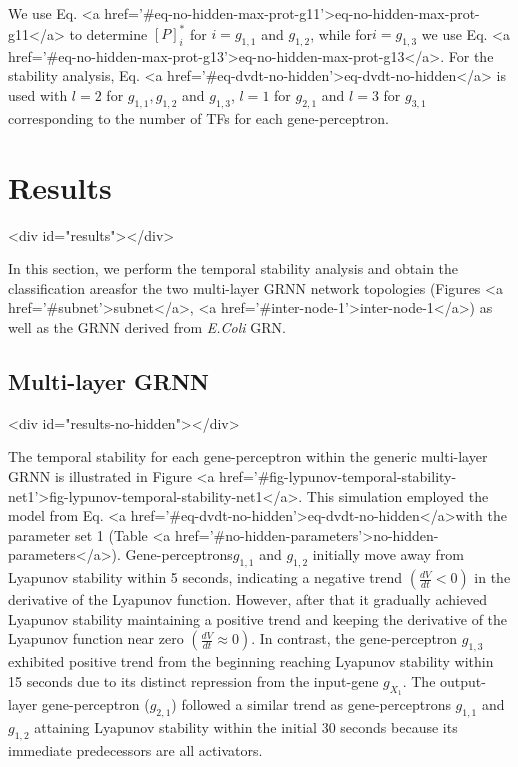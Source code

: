 \documentclass[twocolumn]{biophys-new}
\begin{document}
{{We use Eq. <a href='#eq-no-hidden-max-prot-g11'>eq-no-hidden-max-prot-g11</a> to determine $[P]^*_i$ for $i=g_{1,1}$ and $g_{1,2}$, while for$i=g_{1,3}$ we use Eq. <a href='#eq-no-hidden-max-prot-g13'>eq-no-hidden-max-prot-g13</a>. 
For the stability analysis, Eq. <a href='#eq-dvdt-no-hidden'>eq-dvdt-no-hidden</a> is used with $l=2$ for $g_{1,1}, g_{1,2}$ and $g_{1,3}$, $l=1$ for $g_{2,1}$ and $l=3$ for $g_{3,1}$ corresponding to the number of TFs for each gene-perceptron. 







\section{Results} <div id="results"></div>

In this section, we perform the temporal stability analysis and obtain the classification areasfor the two multi-layer GRNN network topologies (Figures <a href='#subnet'>subnet</a>, <a href='#inter-node-1'>inter-node-1</a>) as well as the GRNN derived from \emph{E.Coli} GRN. 

\subsection{Multi-layer GRNN} <div id="results-no-hidden"></div>


The temporal stability for each gene-perceptron within the generic multi-layer GRNN is illustrated in Figure <a href='#fig-lypunov-temporal-stability-net1'>fig-lypunov-temporal-stability-net1</a>. This simulation employed the model from Eq. <a href='#eq-dvdt-no-hidden'>eq-dvdt-no-hidden</a>with the parameter set 1 (Table <a href='#no-hidden-parameters'>no-hidden-parameters</a>). Gene-perceptrons$g_{1,1}$ and $g_{1,2}$ initially move away from Lyapunov stability within 5 seconds, indicating a negative trend $ \left( \frac{dV}{dt} < 0 \right)$ in the derivative of the Lyapunov function. 
However, after that it gradually achieved Lyapunov stability maintaining a positive trend and keeping the derivative of the Lyapunov function near zero $ \left( \frac{dV}{dt} \approx 0 \right)$. In contrast, the gene-perceptron $g_{1,3}$ exhibited positive trend from the beginning reaching Lyapunov stability within 15 seconds due to its distinct repression from the input-gene $g_{X_1}$. The output-layer gene-perceptron ($g_{2,1}$) followed a similar trend as gene-perceptrons $g_{1,1}$ and $g_{1,2}$ attaining Lyapunov stability within the initial 30 seconds because its immediate predecessors are all activators. 

}}
\end{document}

